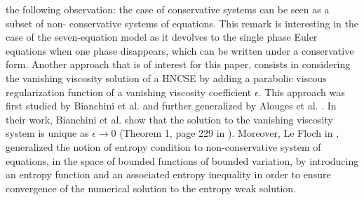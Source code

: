 the following observation: the case of conservative systems can be seen as a subset of non-
conservative systems of equations. This remark is interesting in the case of the seven-equation model as it devolves to the single phase Euler equations
when one phase disappears, which can be written under a conservative form.  
Another approach that is of interest for this paper, consists in considering the 
vanishing viscosity solution of a HNCSE by adding a parabolic viscous regularization function of a vanishing viscosity coefficient $\epsilon$.
This approach was first studied by Bianchini et al. \cite{bianchini_bressan_2005} and 
further generalized by Alouges et al. \cite{alouges_merlet_2004}. In their work, Bianchini et al. show that the solution to the 
vanishing viscosity system is unique as $\epsilon \to 0$ (Theorem 1, page 229 in \cite{bianchini_bressan_2005}). Moreover, Le 
Floch in \cite{lefloch_1988}, generalized the notion of entropy condition to non-conservative system of equations, in the space of 
bounded functions of bounded variation, by introducing an entropy function and an associated entropy inequality in order to ensure convergence of the 
numerical solution to the entropy weak solution.

